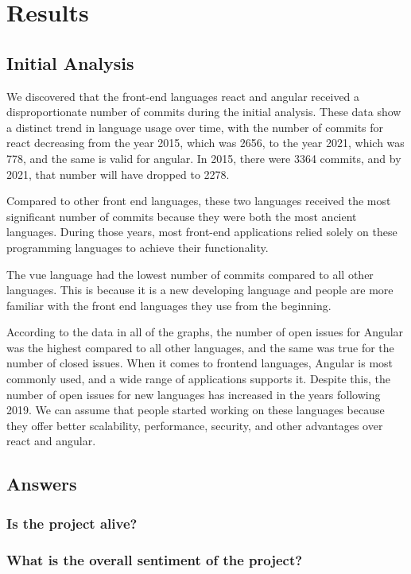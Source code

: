 \section{Results}
\subsection{Initial Analysis}
We discovered that the front-end languages react and angular received a disproportionate number of commits during the initial analysis. These data show a distinct trend in language usage over time, with the number of commits for react decreasing from the year 2015, which was 2656, to the year 2021, which was 778, and the same is valid for angular.
In 2015, there were 3364 commits, and by 2021, that number will have dropped to 2278.

Compared to other front end languages, these two languages received the most significant number of commits because they were both the most ancient languages. During those years, most front-end applications relied solely on these programming languages to achieve their functionality.

The vue language had the lowest number of commits compared to all other languages. This is because it is a new developing language and people are more familiar with the front end languages they use from the beginning.

According to the data in all of the graphs, the number of open issues for Angular was the highest compared to all other languages, and the same was true for the number of closed issues. When it comes to frontend languages, Angular is most commonly used, and a wide range of applications supports it. Despite this, the number of open issues for new languages has increased in the years following 2019. We can assume that people started working on these languages because they offer better scalability, performance, security, and other advantages over react and angular.

\subsection{Answers}
\subsubsection{Is the project alive?}
\subsubsection{What is the overall sentiment of the project?}
